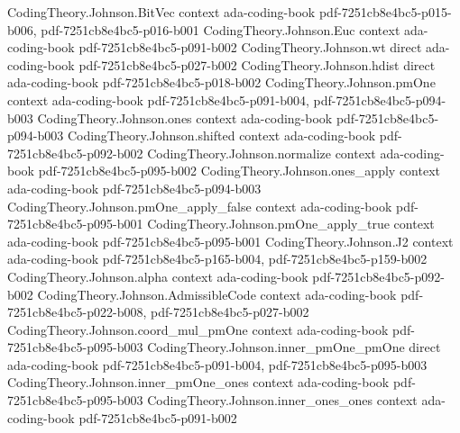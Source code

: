 \begin{theorem}
\label{CodingTheory.Johnson.rankin_finset_bound}
\leanok
{}
\proofstep
  {CodingTheory.Johnson.BitVec}
  {context}
  {ada-coding-book}
  {pdf-7251cb8e4bc5-p015-b006,
    pdf-7251cb8e4bc5-p016-b001}
\proofstep
  {CodingTheory.Johnson.Euc}
  {context}
  {ada-coding-book}
  {pdf-7251cb8e4bc5-p091-b002}
\proofstep
  {CodingTheory.Johnson.wt}
  {direct}
  {ada-coding-book}
  {pdf-7251cb8e4bc5-p027-b002}
\proofstep
  {CodingTheory.Johnson.hdist}
  {direct}
  {ada-coding-book}
  {pdf-7251cb8e4bc5-p018-b002}
\proofstep
  {CodingTheory.Johnson.pmOne}
  {context}
  {ada-coding-book}
  {pdf-7251cb8e4bc5-p091-b004,
    pdf-7251cb8e4bc5-p094-b003}
\proofstep
  {CodingTheory.Johnson.ones}
  {context}
  {ada-coding-book}
  {pdf-7251cb8e4bc5-p094-b003}
\proofstep
  {CodingTheory.Johnson.shifted}
  {context}
  {ada-coding-book}
  {pdf-7251cb8e4bc5-p092-b002}
\proofstep
  {CodingTheory.Johnson.normalize}
  {context}
  {ada-coding-book}
  {pdf-7251cb8e4bc5-p095-b002}
\proofstep
  {CodingTheory.Johnson.ones_apply}
  {context}
  {ada-coding-book}
  {pdf-7251cb8e4bc5-p094-b003}
\proofstep
  {CodingTheory.Johnson.pmOne_apply_false}
  {context}
  {ada-coding-book}
  {pdf-7251cb8e4bc5-p095-b001}
\proofstep
  {CodingTheory.Johnson.pmOne_apply_true}
  {context}
  {ada-coding-book}
  {pdf-7251cb8e4bc5-p095-b001}
\proofstep
  {CodingTheory.Johnson.J2}
  {context}
  {ada-coding-book}
  {pdf-7251cb8e4bc5-p165-b004,
    pdf-7251cb8e4bc5-p159-b002}
\proofstep
  {CodingTheory.Johnson.alpha}
  {context}
  {ada-coding-book}
  {pdf-7251cb8e4bc5-p092-b002}
\proofstep
  {CodingTheory.Johnson.AdmissibleCode}
  {context}
  {ada-coding-book}
  {pdf-7251cb8e4bc5-p022-b008,
    pdf-7251cb8e4bc5-p027-b002}
\proofstep
  {CodingTheory.Johnson.coord_mul_pmOne}
  {context}
  {ada-coding-book}
  {pdf-7251cb8e4bc5-p095-b003}
\proofstep
  {CodingTheory.Johnson.inner_pmOne_pmOne}
  {direct}
  {ada-coding-book}
  {pdf-7251cb8e4bc5-p091-b004,
    pdf-7251cb8e4bc5-p095-b003}
\proofstep
  {CodingTheory.Johnson.inner_pmOne_ones}
  {context}
  {ada-coding-book}
  {pdf-7251cb8e4bc5-p095-b003}
\proofstep
  {CodingTheory.Johnson.inner_ones_ones}
  {context}
  {ada-coding-book}
  {pdf-7251cb8e4bc5-p091-b002}

\end{theorem}
